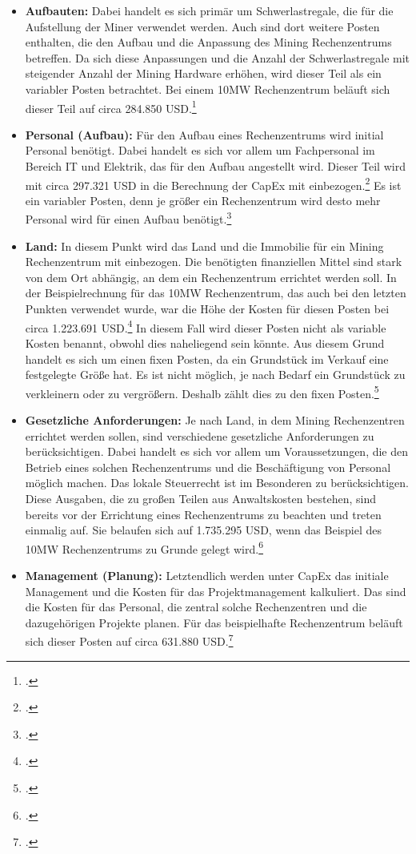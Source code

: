 \begin{itemize}
    \item \textbf{Aufbauten: }Dabei handelt es sich primär um Schwerlastregale, die für die Aufstellung der Miner verwendet
    werden. Auch sind dort weitere Posten enthalten, die den Aufbau und die Anpassung des Mining Rechenzentrums betreffen. Da sich
    diese Anpassungen und die Anzahl der Schwerlastregale mit steigender Anzahl der Mining Hardware erhöhen, wird dieser
    Teil als ein variabler Posten betrachtet. Bei einem 10MW Rechenzentrum beläuft sich dieser Teil auf circa 284.850
    USD.\footcite[Vgl.][]{appendix:capex}
    \item \textbf{Personal (Aufbau): }Für den Aufbau eines Rechenzentrums wird initial Personal benötigt. Dabei handelt es
    sich vor allem um Fachpersonal im Bereich IT und Elektrik, das für den Aufbau angestellt wird. Dieser Teil wird mit circa
    297.321 \ac{USD} in die Berechnung der \ac{CapEx} mit einbezogen.\footcite[Vgl.][]{appendix:capex} Es ist ein variabler
    Posten, denn je größer ein Rechenzentrum wird desto mehr Personal wird für einen Aufbau benötigt.\footcite[Vgl.][]{appendix:capex}
    \item \textbf{Land: }In diesem Punkt wird das Land und die Immobilie für ein Mining Rechenzentrum mit einbezogen. Die
    benötigten finanziellen Mittel sind stark von dem Ort abhängig, an dem ein Rechenzentrum errichtet werden soll. In der
    Beispielrechnung für das 10MW Rechenzentrum, das auch bei den letzten Punkten verwendet wurde, war die Höhe der Kosten
    für diesen Posten bei circa 1.223.691 \ac{USD}.\footcite[Vgl.][]{appendix:capex} In diesem Fall wird dieser Posten nicht
    als variable Kosten benannt, obwohl dies naheliegend sein könnte. Aus diesem Grund handelt es sich um einen fixen Posten,
    da ein Grundstück im Verkauf eine festgelegte Größe hat. Es ist nicht möglich, je nach Bedarf ein Grundstück zu verkleinern
    oder zu vergrößern. Deshalb zählt dies zu den fixen Posten.\footcite[Vgl.][]{appendix:capex}
    \item \textbf{Gesetzliche Anforderungen: }Je nach Land, in dem Mining Rechenzentren errichtet werden sollen, sind
    verschiedene gesetzliche Anforderungen zu berücksichtigen. Dabei handelt es sich vor allem um Voraussetzungen, die den
    Betrieb eines solchen Rechenzentrums und die Beschäftigung von Personal möglich machen. Das lokale Steuerrecht ist im
    Besonderen zu berücksichtigen. Diese Ausgaben, die zu großen Teilen aus Anwaltskosten bestehen, sind bereits vor der
    Errichtung eines Rechenzentrums zu beachten und treten einmalig auf. Sie belaufen sich auf 1.735.295 \ac{USD}, wenn
    das Beispiel des 10MW Rechenzentrums zu Grunde gelegt wird.\footcite[Vgl.][]{appendix:capex}
    \item \textbf{Management (Planung): }Letztendlich werden unter \ac{CapEx} das initiale Management und die Kosten für
    das Projektmanagement kalkuliert. Das sind die Kosten für das Personal, die zentral solche Rechenzentren und die
    dazugehörigen Projekte planen. Für das beispielhafte Rechenzentrum beläuft sich dieser Posten auf circa
    631.880 USD.\footcite[Vgl.][]{appendix:capex}
\end{itemize}

